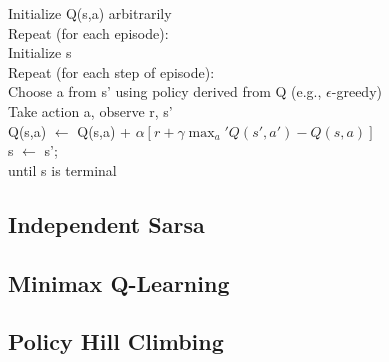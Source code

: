\documentclass{article}
\newcommand{\tab}{\hspace{10mm}}
\newcommand{\dtab}{\hspace{20mm}}
\begin{document}
\begin{center} 
\begin{mdframed}
\begin{algorithm}[H]
Initialize Q(s,a) arbitrarily \\
Repeat (for each episode):\\
\tab Initialize s \\
\tab Repeat (for each step of episode):\\
\dtab Choose a from s' using policy derived from Q (e.g., $\epsilon$-greedy)\\
\dtab Take action a, observe r, s'\\
\dtab Q(s,a) $\leftarrow$ Q(s,a) + $\alpha [ r + \gamma \max_a' Q(s', a') - Q(s, a) ]$  \\
\dtab s $\leftarrow$ s'; \\
\tab until s is terminal\\
\end{algorithm}
\end{mdframed}
\label{alg:qlearning}
\end{center}


\subsection{Independent Sarsa}



\subsection{Minimax Q-Learning} 


\subsection{Policy Hill Climbing} 


\begin{comment}
Initialize:
For all s in S, a in A, and o in O,
Let Q[s,a,o] := 1
For all s in S,
Let V[s] := 1
For all s in S, a in A,
Let pi[s,a] := 1/|A|
Let alpha := 1.0
Choose an action:
With probability explor, return an action uniformly at random.
Otherwise, if current state is s,
Return action a with probability pi[s,a].
Learn:
After receiving reward rew for moving from state s to s’
via action a and opponent’s action o,
Let Q[s,a,o] := (1-alpha) * Q[s,a,o] + alpha * (rew + gamma * V[s’])
Use linear programming to find pi[s,.] such that:
pi[s,.] := argmaxfpi’[s,.], minfo’, sumfa’, pi[s,a’] * Q[s,a’,o’]ggg
Let V[s] := minfo’, sumfa’, pi[s,a’] * Q[s,a’,o’]gg
Let alpha := alpha * decay
\end{comment}
\end{document}
